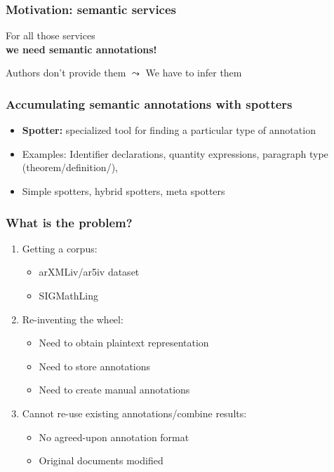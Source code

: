\documentclass[aspectratio=169]{beamer}
\begin{document}
\begin{frame}
    \frametitle{Motivation: semantic services}
    \centering
    \Large
    For all those services\\
    {\bfseries we need semantic annotations!}
    \vspace{2em}\par
    \pause
    Authors don't provide them $\leadsto$ We have to infer them
\end{frame}


\begin{frame}
    \frametitle{Accumulating semantic annotations with spotters}
    \begin{itemize}
        \item \textbf{Spotter:} specialized tool for finding a particular type of annotation
        \item Examples: Identifier declarations, quantity expressions,
            paragraph type (theorem/definition/\textellipsis), \textellipsis
        \item Simple spotters, hybrid spotters, meta spotters
    \end{itemize}
\end{frame}


\begin{frame}
    \frametitle{What is the problem?}
    \begin{enumerate}
        \item Getting a corpus:
            \begin{itemize}
                \item arXMLiv/ar5iv dataset
                \item SIGMathLing
            \end{itemize}
        \item Re-inventing the wheel:
            \begin{itemize}
                \item Need to obtain plaintext representation
                \item Need to store annotations
                \item Need to create manual annotations
            \end{itemize}
        \item Cannot re-use existing annotations/combine results:
            \begin{itemize}
                \item No agreed-upon annotation format
                \item Original documents modified
            \end{itemize}
    \end{enumerate}
\end{frame}
\end{document}
